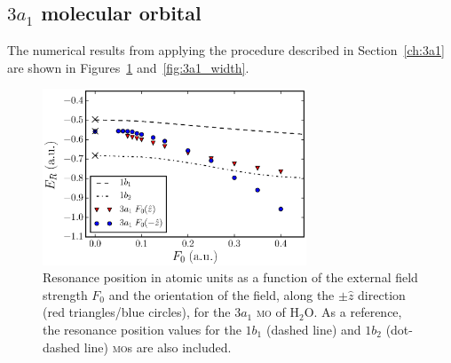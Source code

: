 


\subsection{$3a_{1}$ molecular orbital}
\label{ch:3a1_results}

The numerical results from applying the procedure described in
Section~\ref{ch:3a1} are shown in Figures~\ref{fig:3a1_position}
and~\ref{fig:3a1_width}.

\begin{figure}
  \centering
  \includegraphics[width=0.7\textwidth]{figures/ch_H2O/3a1/resPosvsForbitals_compf32snew.eps}
  \caption{Resonance position in atomic units as a function of the
    external field strength $F_{0}$ and the orientation of the field,
    along the $\pm\hat{z}$ direction (red triangles/blue circles), for
    the $3a_{1}$ \textsc{mo} of H$_{2}$O. As a reference, the resonance
    position values for the $1b_{1}$ (dashed line) and $1b_{2}$
    (dot-dashed line) \textsc{mo}s are also included.}
  \label{fig:3a1_position}
\end{figure}

